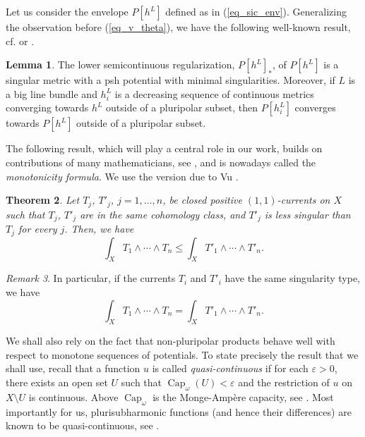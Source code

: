 \documentclass[12pt]{article}
\numberwithin{equation}{section}
\theoremstyle{theorem}
\newtheorem{thm}{Theorem}[section]
\theoremstyle{definition}
\newtheorem{lem}[thm]{Lemma}
\theoremstyle{remark}
\newtheorem{rem}[thm]{Remark}
\begin{document}
	Let us consider the envelope $P[h^L]$ defined as in (\ref{eq_sic_env}).
	Generalizing the observation before (\ref{eq_v_theta}), we have the following well-known result, cf. \cite[Proposition 9.17]{GuedjZeriahBook} or \cite[Proposition 2.2]{GuedjLuZeriahEnv}.
	\begin{lem}\label{lem_env_sing_vers}
		The lower semicontinuous regularization, $P[h^L]_*$, of $P[h^L]$ is a singular metric with a psh potential with minimal singularities.
		Moreover, if $L$ is a big line bundle and $h^L_i$ is a decreasing sequence of continuous metrics converging towards $h^L$ outside of a pluripolar subset, then $P[h^L_i]$ converges towards $P[h^L]$ outside of a pluripolar subset.
	\end{lem}
	\par 
	The following result, which will play a central role in our work, builds on contributions of many mathematicians, see \cite{BEGZ, WittNystrMonotonicity, LuChinhCompMA, LuNguen, DDLMonoton}, and is nowadays called the \textit{monotonicity formula}. 
	We use the version due to Vu \cite[Theorem 4.4]{VuDucRelNonpp}.
	\begin{thm}\label{thm_wn_monot}
		Let $T_j$, $T'_j$, $j = 1, \ldots, n$, be closed positive $(1, 1)$-currents on $X$ such that $T_j$, $T'_j$ are in the same cohomology class, and $T'_j$ is less singular than $T_j$ for every $j$. 
		Then, we have
		\begin{equation}
			\int_X T_1 \wedge \cdots \wedge T_n \leq \int_X T'_1 \wedge \cdots \wedge T'_n.
		\end{equation}
	\end{thm}
	\begin{rem}\label{rem_sam_sing_type}
		In particular, if the currents $T_i$ and $T'_i$ have the same singularity type, we have
		\begin{equation}
			\int_X T_1 \wedge \cdots \wedge T_n = \int_X T'_1 \wedge \cdots \wedge T'_n.
		\end{equation}
	\end{rem}
	We shall also rely on the fact that non-pluripolar products behave well with respect to monotone sequences of potentials.
	To state precisely the result that we shall use, recall that a function $u$ is called \textit{quasi-continuous} if for each $\varepsilon > 0$, there exists an open set $U$ such that $\operatorname{Cap}_\omega(U) < \varepsilon$ and the restriction of $u$ on $X \setminus U$ is continuous.
	Above $\operatorname{Cap}_\omega$ is the Monge-Ampère capacity, see \cite[Definition 4.16]{GuedjZeriahBook}.
	Most importantly for us, plurisubharmonic functions (and hence their differences) are known to be quasi-continuous, see \cite[Theorem 4.20]{GuedjZeriahBook}.
\end{document}
